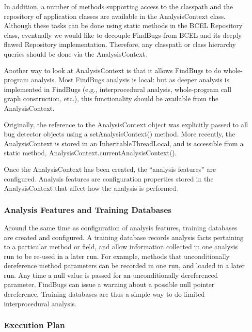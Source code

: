 \documentclass[11pt]{article}
\begin{document}
In addition, a number of methods supporting access to the classpath and the
repository of application classes are available in the AnalysisContext class.
Although these tasks can be done using static methods in the BCEL
Repository class, eventually we would like to decouple FindBugs from BCEL
and its deeply flawed Repository implementation.  Therefore, any classpath
or class hierarchy queries should be done via the AnalysisContext.

Another way to look at AnalysisContext is that it allows FindBugs to do
whole-program analysis.  Most FindBugs analysis is local: but as deeper
analysis is implemented in FindBugs (e.g., interprocedural analysis,
whole-program call graph construction, etc.), this functionality should
be available from the AnalysisContext.

Originally, the reference to the AnalysisContext object was explicitly
passed to all bug detector objects using a setAnalysisContext() method.
More recently, the AnalysisContext is stored in an InheritableThreadLocal, and is accessible
from a static method, AnalysisContext.currentAnalysisContext().

Once the AnalysisContext has been created, the ``analysis features'' are configured.
Analysis features are configuration properties stored in the AnalysisContext that
affect how the analysis is performed.

\subsubsection{Analysis Features and Training Databases}

Around the same time as configuration of analysis features, training
databases are created and configured.  A training database records analysis facts
pertaining to a particular method or field, and allow information collected
in one analysis run to be re-used in a later run.  For example, methods that
unconditionally dereference method parameters can be recorded in one run,
and loaded in a later run.  Any time a null value is passed for an unconditionally
dereferenced parameter, FindBugs can issue a warning about a possible null pointer
dereference.  Training databases are thus a simple way to do limited interprocedural
analysis.

\subsubsection{Execution Plan}
\end{document}
